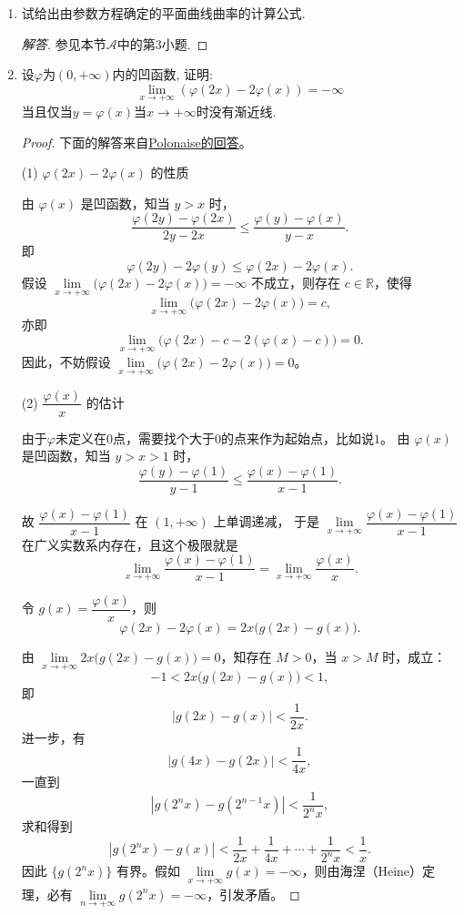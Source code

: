 \begin{4b}
\begin{enumerate}
\item 试给出由参数方程确定的平面曲线曲率的计算公式.
\begin{proof}[解答]
参见本节\(\boldsymbol{\mathcal{A}}\)中的第3小题.
\end{proof}

\item 设\(\varphi\)为\((0,+\infty)\)内的凹函数, 证明:
\[\lim_{x\rightarrow+\infty}\left(\varphi(2x)-2\varphi(x)\right)=-\infty\]
当且仅当\(y=\varphi(x)\)当\(x\rightarrow+\infty\)时没有渐近线.
\begin{proof}
    下面的解答来自\href{https://zhuanlan.zhihu.com/p/450135371?utm_psn=1822598991424122880}{Polonaise的回答}。

(1) $\varphi(2x)-2\varphi(x)$ 的性质

由 $\varphi(x)$ 是凹函数，知当 $y>x$ 时，
\[
\frac{\varphi(2y)-\varphi(2x)}{2y-2x}\leqslant\frac{\varphi(y)-\varphi(x)}{y-x}.
\]
即
\[\varphi(2y)-2\varphi(y)\leqslant\varphi(2x)-2\varphi(x).\]
假设 $\lim\limits_{x\rightarrow+\infty}\bigl( \varphi(2x)-2\varphi(x) \bigr)=-\infty$ 不成立，则存在 $c\in\mathbb{R}$，使得
\[\lim_{x\rightarrow+\infty}\bigl( \varphi(2x)-2\varphi(x) \bigr)=c,\]
亦即
\[\lim_{x\rightarrow+\infty}\bigl( \varphi(2x)-c-2(\varphi(x)-c) \bigr)=0.\]
因此，不妨假设 $\lim\limits_{x\rightarrow+\infty}\bigl( \varphi(2x)-2\varphi(x) \bigr)=0$。

(2) $\dfrac{\varphi(x)}{x}$ 的估计

由于$\varphi$未定义在$0$点，需要找个大于$0$的点来作为起始点，比如说$1$。
由 $\varphi(x)$ 是凹函数，知当 $y>x>1$ 时，
\[\frac{\varphi(y)-\varphi(1)}{y-1}\leqslant\frac{\varphi(x)-\varphi(1)}{x-1}.\]

故 $\dfrac{\varphi(x)-\varphi(1)}{x-1}$ 在 $(1,+\infty)$ 上单调递减，
于是 $\lim\limits_{x\rightarrow+\infty}\dfrac{\varphi(x)-\varphi(1)}{x-1}$ 在广义实数系内存在，且这个极限就是
\[\lim_{x\rightarrow+\infty}\frac{\varphi(x)-\varphi(1)}{x-1}
=\lim_{x\rightarrow+\infty}\frac{\varphi(x)}{x}.\]

令 $g(x)=\dfrac{\varphi(x)}{x}$，则
\[\varphi(2x)-2\varphi(x)=2x\bigl( g(2x)-g(x) \bigr).\]

由 $\lim\limits_{x\rightarrow+\infty}2x\bigl( g(2x)-g(x) \bigr)=0$，知存在 $M>0$，当 $x>M$ 时，成立：
\[-1<2x\bigl( g(2x)-g(x) \bigr)<1,\]
即
\[|g(2x)-g(x)|<\frac{1}{2x}.\]
进一步，有
\[|g(4x)-g(2x)|<\frac{1}{4x},\]
一直到
\[|g(2^nx)-g(2^{n-1}x)|<\frac{1}{2^nx},\]
求和得到
\[|g(2^nx)-g(x)|<\frac{1}{2x}+\frac{1}{4x}+\cdots+\frac{1}{2^nx}<\frac{1}{x}.\]
因此 $\bigl\{g(2^nx)\bigr\}$ 有界。假如 $\lim\limits_{x\rightarrow+\infty}g(x)=-\infty$，则由海涅（Heine）定理，必有 $\lim\limits_{n\rightarrow+\infty}g(2^nx)=-\infty$，引发矛盾。


\end{proof}
\end{enumerate}
\end{4b}
